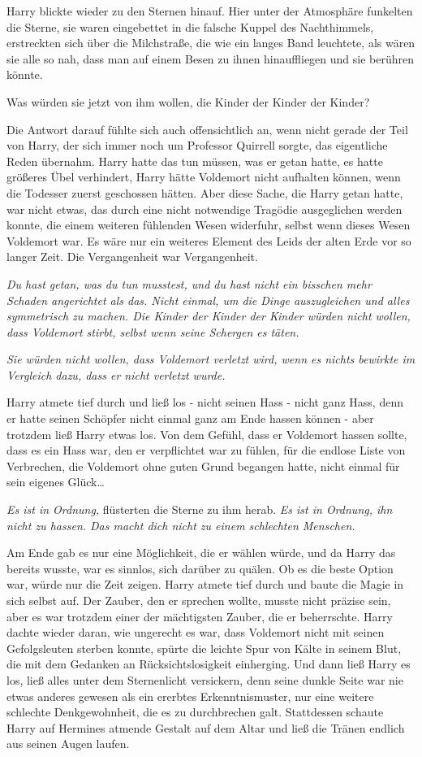 {Harry blickte wieder zu den Sternen hinauf. Hier unter der Atmosphäre funkelten die Sterne, sie waren eingebettet in die falsche Kuppel des Nachthimmels, erstreckten sich über die Milchstraße, die wie ein langes Band leuchtete, als wären sie alle so nah, dass man auf einem Besen zu ihnen hinauffliegen und sie berühren könnte.

Was würden sie jetzt von ihm wollen, die Kinder der Kinder der Kinder?

Die Antwort darauf fühlte sich auch offensichtlich an, wenn nicht gerade der Teil von Harry, der sich immer noch um Professor Quirrell sorgte, das eigentliche Reden übernahm. Harry hatte das tun müssen, was er getan hatte, es hatte größeres Übel verhindert, Harry hätte Voldemort nicht aufhalten können, wenn die Todesser zuerst geschossen hätten. Aber diese Sache, die Harry getan hatte, war nicht etwas, das durch eine nicht notwendige Tragödie ausgeglichen werden konnte, die einem weiteren fühlenden Wesen widerfuhr, selbst wenn dieses Wesen Voldemort war. Es wäre nur ein weiteres Element des Leids der alten Erde vor so langer Zeit. Die Vergangenheit war Vergangenheit.

\emph{Du hast getan, was du tun musstest, und du hast nicht ein bisschen mehr Schaden angerichtet als das. Nicht einmal, um die Dinge auszugleichen und alles symmetrisch zu machen. Die Kinder der Kinder der Kinder würden nicht wollen, dass Voldemort stirbt, selbst wenn seine Schergen es täten.}

\emph{Sie würden nicht wollen, dass Voldemort verletzt wird, wenn es nichts bewirkte im Vergleich dazu, dass er nicht verletzt wurde.}

Harry atmete tief durch und ließ los - nicht seinen Hass - nicht ganz Hass, denn er hatte seinen Schöpfer nicht einmal ganz am Ende hassen können - aber trotzdem ließ Harry etwas los. Von dem Gefühl, dass er Voldemort hassen sollte, dass es ein Hass war, den er verpflichtet war zu fühlen, für die endlose Liste von Verbrechen, die Voldemort ohne guten Grund begangen hatte, nicht einmal für sein eigenes Glück…

\emph{Es ist in Ordnung,} flüsterten die Sterne zu ihm herab. \emph{Es ist in Ordnung, ihn nicht zu hassen. Das macht dich nicht zu einem schlechten Menschen.}

Am Ende gab es nur eine Möglichkeit, die er wählen würde, und da Harry das bereits wusste, war es sinnlos, sich darüber zu quälen. Ob es die beste Option war, würde nur die Zeit zeigen. Harry atmete tief durch und baute die Magie in sich selbst auf. Der Zauber, den er sprechen wollte, musste nicht präzise sein, aber es war trotzdem einer der mächtigsten Zauber, die er beherrschte. Harry dachte wieder daran, wie ungerecht es war, dass Voldemort nicht mit seinen Gefolgsleuten sterben konnte, spürte die leichte Spur von Kälte in seinem Blut, die mit dem Gedanken an Rücksichtslosigkeit einherging. Und dann ließ Harry es los, ließ alles unter dem Sternenlicht versickern, denn seine dunkle Seite war nie etwas anderes gewesen als ein ererbtes Erkenntnismuster, nur eine weitere schlechte Denkgewohnheit, die es zu durchbrechen galt. Stattdessen schaute Harry auf Hermines atmende Gestalt auf dem Altar und ließ die Tränen endlich aus seinen Augen laufen.

}
